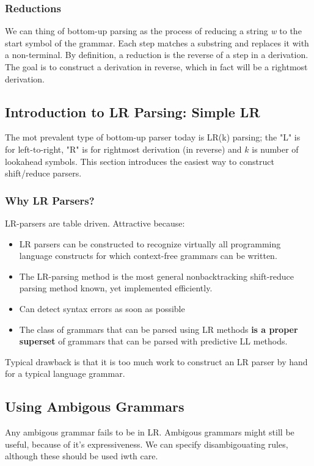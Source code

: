 \documentclass{article}
\begin{document}
\subsubsection{Reductions} %
\label{ssub:Reductions}
We can thing of bottom-up parsing as the process of reducing a string \emph{w} to the start symbol of the grammar. Each step matches a substring and replaces it with a non-terminal. By definition, a reduction is the reverse of a step in a derivation. The goal is to construct a derivation in reverse, which in fact will be a rightmost derivation.


\subsection{Introduction to LR Parsing: Simple LR} %
\label{sub:Introduction to LR Parsing: Simple LR}
The mot prevalent type of bottom-up parser today is LR(k) parsing; the "L" is for left-to-right, "R" is for rightmost derivation (in reverse) and $k$ is number of lookahead symbols. This section introduces the easiest way to construct shift/reduce parsers.

\subsubsection{Why LR Parsers?} %
\label{ssub:Why LR Parsers?}
LR-parsers are table driven. Attractive because:
\begin{itemize}
	\item LR parsers can be constructed to recognize virtually all programming language constructs for which context-free grammars can be written.
	\item The LR-parsing method is the most general nonbacktracking shift-reduce parsing method known, yet implemented efficiently.
	\item Can detect syntax errors as soon as possible
	\item The class of grammars that can be parsed using LR methods \textbf{is a proper superset} of grammars that can be parsed with predictive LL methods. 
\end{itemize}
Typical drawback is that it is too much work to construct an LR parser by hand for a typical language grammar.

\subsection{Using Ambigous Grammars} %
\label{sub:Using Ambigous Grammars}
Any ambigous grammar fails to be in LR. Ambigous grammars might still be useful, because of it's expressiveness. We can specify disambigouating rules, although these should be used iwth care.
\end{document}
